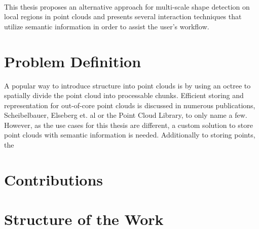 \\
This thesis proposes an alternative approach for multi-scale shape detection on local regions in point clouds and presents several interaction techniques that utilize semantic information in order to assist the user's workflow. 


\section{Problem Definition}


A popular way to introduce structure into point clouds is by using an octree to spatially divide the point cloud into processable chunks. 
Efficient storing and representation for out-of-core point clouds is discussed in numerous publications, Scheibelbauer\cite{scheiblauer-thesis}, Elseberg et. al\cite{elseberg2013one} or the Point Cloud Library\cite{rusu20113d}, to only name a few. However, as the use cases for this thesis are different, a custom solution to store point clouds with semantic information is needed. Additionally to storing points, the 





\section{Contributions}
\section{Structure of the Work}




